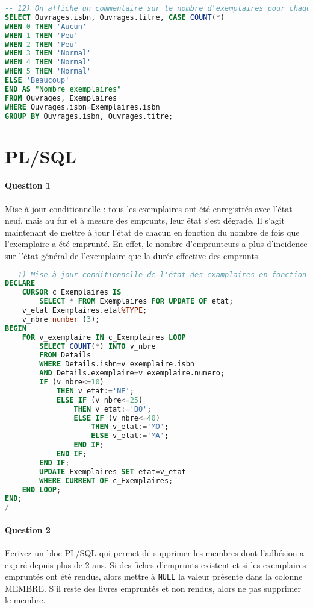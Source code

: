 \documentclass[10pt, oneside]{article}
\begin{document}
\begin{lstlisting}[language=sql, title=Question 12, label=QIII12]
-- 12) On affiche un commentaire sur le nombre d'exemplaires pour chaque ouvrage (Aucun, peu, normal, beaucoup)
SELECT Ouvrages.isbn, Ouvrages.titre, CASE COUNT(*)
WHEN 0 THEN 'Aucun'
WHEN 1 THEN 'Peu'
WHEN 2 THEN 'Peu'
WHEN 3 THEN 'Normal'
WHEN 4 THEN 'Normal'
WHEN 5 THEN 'Normal'
ELSE 'Beaucoup'
END AS "Nombre exemplaires"
FROM Ouvrages, Exemplaires
WHERE Ouvrages.isbn=Exemplaires.isbn
GROUP BY Ouvrages.isbn, Ouvrages.titre;
\end{lstlisting}


\section{PL/SQL}


\paragraph{Question 1} Mise à jour conditionnelle : tous les exemplaires ont été enregistrés avec l'état neuf, mais au fur et à mesure des emprunts, leur état s'est dégradé. Il s'agit maintenant de mettre à jour l'état de chacun en fonction du nombre de fois que l'exemplaire a été emprunté. En effet, le nombre d'emprunteurs a plus d'incidence sur l'état général de l'exemplaire que la durée effective des emprunts.

\begin{lstlisting}[language=sql, title=Question 1, label=QIV1]
-- 1) Mise à jour conditionnelle de l'état des examplaires en fonction du nombre d'emprunts
DECLARE 
	CURSOR c_Exemplaires IS
		SELECT * FROM Exemplaires FOR UPDATE OF etat;
	v_etat Exemplaires.etat%TYPE;
	v_nbre number (3);
BEGIN 
	FOR v_exemplaire IN c_Exemplaires LOOP
		SELECT COUNT(*) INTO v_nbre
		FROM Details
		WHERE Details.isbn=v_exemplaire.isbn
		AND Details.exemplaire=v_exemplaire.numero;
		IF (v_nbre<=10)
			THEN v_etat:='NE';
			ELSE IF (v_nbre<=25)
				THEN v_etat:='BO';
				ELSE IF (v_nbre<=40)
					THEN v_etat:='MO';
					ELSE v_etat:='MA';
				END IF;
			END IF;
		END IF;
		UPDATE Exemplaires SET etat=v_etat
		WHERE CURRENT OF c_Exemplaires;
	END LOOP;
END;
/
\end{lstlisting}


\paragraph{Question 2} Ecrivez un bloc PL/SQL qui permet de supprimer les membres dont l'adhésion a expiré depuis plus de 2 ans.
Si des fiches d'emprunts existent et si les exemplaires empruntés ont été rendus, alors mettre à \texttt{NULL} la valeur présente dans la colonne MEMBRE.
S'il reste des livres empruntés et non rendus, alors ne pas supprimer le membre.
\end{document}
